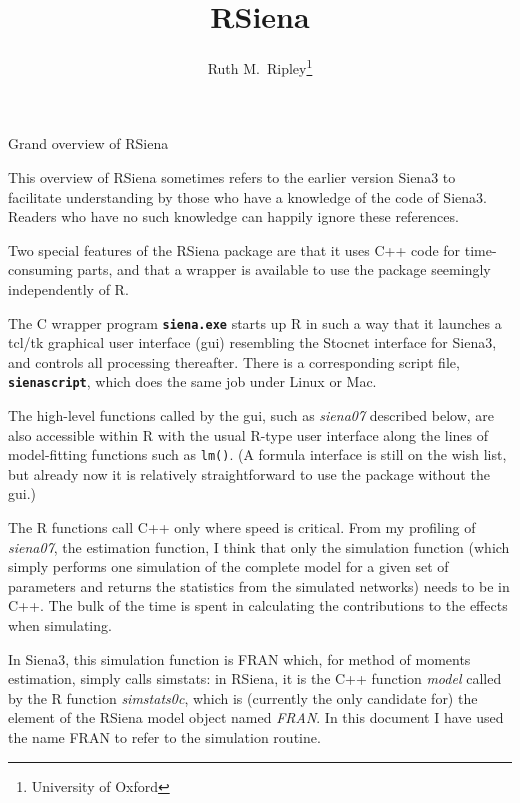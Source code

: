\documentclass[12pt,a4paper]{article}
\makeatletter
\renewcommand{\=}{\,=\,}
\newcommand{\+}{\,+\,}
\newcommand{\nm}[1]{\textsf{\small #1}}
\newcommand{\nnm}[1]{\textsf{\small\textit{#1}}}
\renewcommand{\section}{\@startsection{section}{1}
                {0pt}{\baselineskip}{0.5\baselineskip}
                {\centering\sffamily} }
\newcommand{\sfn}[1]{\textbf{\texttt{#1}}}
\newcommand{\R}{{\sf R }}
\newcommand{\Rn}{{\sf R}}
\newcommand{\rs}{{\sf RSiena}}
\newcommand{\RS}{{\sf RSiena }}
\newcommand{\SI}{{\sf Siena3 }}
\newcommand{\Sn}{{\sf Siena3}}
\makeatother
\begin{document}

\title{RSiena}
\author{Ruth M.\ Ripley\footnote{University of Oxford}}
\maketitle
\date{}


\section{Grand overview of  RSiena}

This overview of \RS sometimes refers to the earlier version \SI to
facilitate understanding by those who have a knowledge
of the code of \Sn. Readers who have no such knowledge
can happily ignore these references.

Two special features of the \RS package are that it uses C++ code
for time-consuming parts, and that a wrapper is available to use
the package seemingly independently of \Rn.

The C wrapper program \sfn{siena.exe} starts up \R in
such a way that it launches a tcl/tk graphical user interface (gui)
resembling the Stocnet interface for \Sn,
and controls all processing thereafter. There is a corresponding script file,
\sfn{sienascript}, which does the same job under Linux or Mac.

The high-level functions called by the gui, such as \nnm{siena07} described below,
are also accessible within \R with the usual \Rn-type user interface
along the lines
of model-fitting functions such as \verb|lm()|. (A formula interface is still on
the wish list, but already now it is relatively straightforward to use the package without
the gui.)

The \R functions call C++ only where speed is critical. From my profiling of
\nnm{siena07}, the estimation function, I think that only the simulation
function (which simply performs one simulation of the complete model for a given
set of parameters and returns the statistics from the simulated networks) needs
to be in C++. The bulk of the time is spent in calculating the contributions to
the effects when simulating.

In \Sn, this simulation function is \nm{FRAN} which, for method of moments
estimation, simply calls \nm{simstats}: in \rs, it is the C++ function
\nnm{model} called by the \R function \nnm{simstats0c}, which is (currently the
only candidate for) the element of the \RS model object named \nnm{FRAN}. In
this document I have used the name \nm{FRAN} to refer to the simulation routine.
\end{document}
